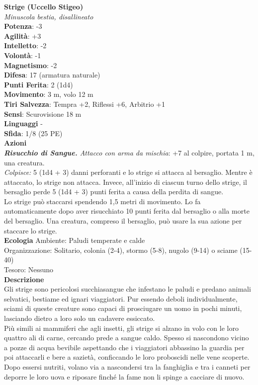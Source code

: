\begin{multicols}{2}
\medskip\textbf{Strige (Uccello Stigeo)}\\
\emph{Minuscola bestia, disallineato}\\
\textbf{Potenza}: -3\\
\textbf{Agilità}: +3\\
\textbf{Intelletto}: -2\\
\textbf{Volontà}: -1\\
\textbf{Magnetismo}: -2\\
\textbf{Difesa}: 17 (armatura naturale)\\
\textbf{Punti Ferita}: 2 (1d4)\\
\textbf{Movimento}: 3 m, volo 12 m\\
\textbf{Tiri Salvezza}: Tempra +2, Riflessi +6, Arbitrio +1\\
\textbf{Sensi}: Scurovisione 18 m\\
\textbf{Linguaggi} -\\
\textbf{Sfida}: 1/8 (25 PE)\smallskip\\
\smallskip\textbf{Azioni}\\
\emph{\textbf{Risucchio di Sangue.} Attacco con arma da mischia}: +7 al colpire, portata 1 m, una creatura.\\
\emph{Colpisce:} 5 (1d4 + 3) danni perforanti e lo strige si attacca al bersaglio. Mentre è attaccato, lo strige non attacca. Invece, all'inizio di ciascun turno dello strige, il bersaglio perde 5 (1d4 + 3) punti ferita a causa della perdita di sangue.\\
Lo strige può staccarsi spendendo 1,5 metri di movimento. Lo fa automaticamente dopo aver risucchiato 10 punti ferita dal bersaglio o alla morte del bersaglio. Una creatura, compreso il bersaglio, può usare la sua azione per staccare lo strige.\\
\textbf{Ecologia}
Ambiente: Paludi temperate e calde\\
Organizzazione: Solitario, colonia (2-4), stormo (5-8), nugolo (9-14) o sciame (15-40)\\
Tesoro: Nessuno\\
\textbf{Descrizione}\\
Gli strige sono pericolosi succhiasangue che infestano le paludi e predano animali selvatici, bestiame ed ignari viaggiatori. Pur essendo deboli individualmente, sciami di queste creature sono capaci di prosciugare un uomo in pochi minuti, lasciando dietro a loro solo un cadavere essiccato.\\

Più simili ai mammiferi che agli insetti, gli strige si alzano in volo con le loro quattro ali di carne, cercando prede a sangue caldo. Spesso si nascondono vicino a pozze di acqua bevibile aspettando che i viaggiatori abbassino la guardia per poi attaccarli e bere a sazietà, conficcando le loro proboscidi nelle vene scoperte. Dopo essersi nutriti, volano via a nascondersi tra la fanghiglia e tra i canneti per deporre le loro uova e riposare finché la fame non li spinge a cacciare di nuovo.\\


\end{multicols}
